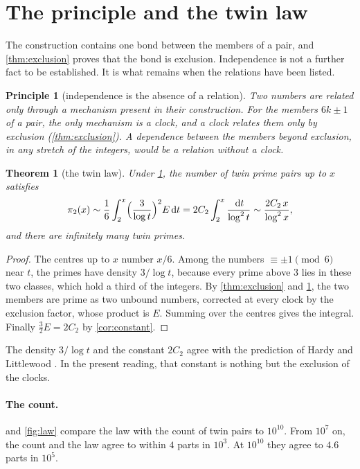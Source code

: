\documentclass[11pt]{article}
\newtheorem{theorem}{Theorem}[section]
\newtheorem{principle}{Principle}
\theoremstyle{definition}\newtheorem{definition}[theorem]{Definition}
\theoremstyle{remark}\newtheorem{remark}[theorem]{Remark}
\newcommand{\dd}{\,\mathrm d}\newcommand{\e}{\mathrm e}
\begin{document}
\section{The principle and the twin law}\label{sec:law}

The construction contains one bond between the members of a pair, and \cref{thm:exclusion} proves that the bond is exclusion. Independence is not a further fact to be established. It is what remains when the relations have been listed.

\begin{principle}[independence is the absence of a relation]\label{pr:independence}
Two numbers are related only through a mechanism present in their construction. For the members $6k\pm1$ of a pair, the only mechanism is a clock, and a clock relates them only by exclusion (\cref{thm:exclusion}). A dependence between the members beyond exclusion, in any stretch of the integers, would be a relation without a clock.
\end{principle}

\begin{theorem}[the twin law]\label{thm:law}
Under \cref{pr:independence}, the number of twin prime pairs up to $x$ satisfies
\[
\pi_2(x)\sim\frac16\int_2^x\Bigl(\frac3{\log t}\Bigr)^2E\dd t=2C_2\int_2^x\frac{\dd t}{\log^2t}\sim\frac{2C_2\,x}{\log^2x},
\]
and there are infinitely many twin primes.
\end{theorem}
\begin{proof}
The centres up to $x$ number $x/6$. Among the numbers $\equiv\pm1\pmod 6$ near $t$, the primes have density $3/\log t$, because every prime above $3$ lies in these two classes, which hold a third of the integers. By \cref{thm:exclusion} and \cref{pr:independence}, the two members are prime as two unbound numbers, corrected at every clock by the exclusion factor, whose product is $E$. Summing over the centres gives the integral. Finally $\tfrac32E=2C_2$ by \cref{cor:constant}.
\end{proof}

The density $3/\log t$ and the constant $2C_2$ agree with the prediction of Hardy and Littlewood \cite{HL23}. In the present reading, that constant is nothing but the exclusion of the clocks.

\paragraph{The count.}  and \cref{fig:law} compare the law with the count of twin pairs to $10^{10}$. From $10^7$ on, the count and the law agree to within $4$ parts in $10^3$. At $10^{10}$ they agree to $4.6$ parts in $10^5$.
\end{document}
